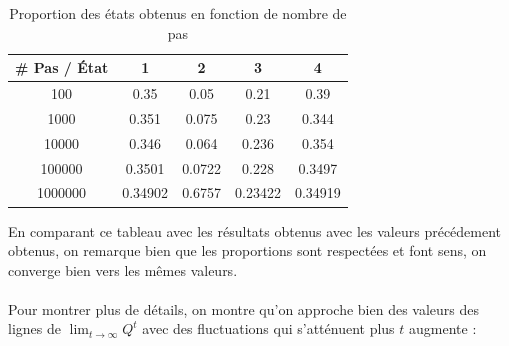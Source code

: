 \begin{table}[h!]
  \begin{tabular}{|c|c|c|c|c|}
  \hline
  \# Pas / État & \multicolumn{1}{c|}{1} & \multicolumn{1}{c|}{2} & \multicolumn{1}{c|}{3} & 4 \\ \hline
  100     & 0.35    & 0.05   & 0.21    & 0.39    \\ \hline
  1000    & 0.351   & 0.075  & 0.23    & 0.344   \\ \hline
  10000   & 0.346   & 0.064  & 0.236   & 0.354   \\ \hline
  100000  & 0.3501  & 0.0722 & 0.228   & 0.3497  \\ \hline
  1000000 & 0.34902 & 0.6757 & 0.23422 & 0.34919 \\ \hline
  \end{tabular}
  \centering
  \caption{Proportion des états obtenus en fonction de nombre de pas}
  \label{tab:table-prop}
\end{table}
En comparant ce tableau avec les résultats obtenus avec les valeurs précédement obtenus, on remarque bien que les proportions sont respectées et font sens, on converge bien 
vers les mêmes valeurs.
\\\\
Pour montrer plus de détails, on montre qu'on approche bien des valeurs des lignes de $\lim_{t \rightarrow \infty} Q^t$ avec des fluctuations qui s'atténuent plus $t$ augmente :

